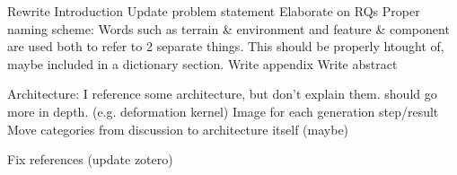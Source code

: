 Rewrite Introduction
Update problem statement
Elaborate on RQs
Proper naming scheme:
    Words such as terrain & environment  and feature & component are used both to refer to 2 separate things. This should be properly htought of, maybe included in a dictionary section.
Write appendix
Write abstract

Architecture:
    I reference some architecture, but don't explain them. should go more in depth. (e.g. deformation kernel)
    Image for each generation step/result
    Move categories from discussion to architecture itself (maybe)


Fix references (update zotero)
